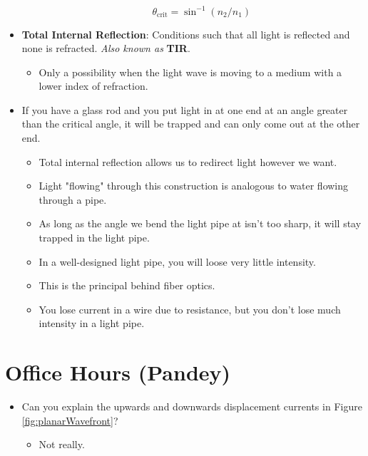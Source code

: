 \documentclass[../notes.tex]{subfiles}
\begin{document}
\begin{itemize}
\begin{itemize}
        \begin{equation*}
            \theta_\text{crit} = \sin^{-1}(n_2/n_1)
        \end{equation*}
    \end{itemize}
    \item \textbf{Total Internal Reflection}: Conditions such that all light is reflected and none is refracted. \emph{Also known as} \textbf{TIR}.
    \begin{itemize}
        \item Only a possibility when the light wave is moving to a medium with a lower index of refraction.
    \end{itemize}
    \item If you have a glass rod and you put light in at one end at an angle greater than the critical angle, it will be trapped and can only come out at the other end.
    \begin{itemize}
        \item Total internal reflection allows us to redirect light however we want.
        \item Light "flowing" through this construction is analogous to water flowing through a pipe.
        \item As long as the angle we bend the light pipe at isn't too sharp, it will stay trapped in the light pipe.
        \item In a well-designed light pipe, you will loose very little intensity.
        \item This is the principal behind fiber optics.
        \item You lose current in a wire due to resistance, but you don't lose much intensity in a light pipe.
    \end{itemize}
\end{itemize}



\section{Office Hours (Pandey)}
\begin{itemize}
    \item {}Can you explain the upwards and downwards displacement currents in Figure \ref{fig:planarWavefront}?
    \begin{itemize}
        \item Not really.
    \end{itemize}
\end{itemize}
\end{document}
